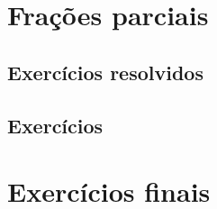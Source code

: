 \section{Frações parciais}
\construirSec


\subsection*{Exercícios resolvidos}

\construirExeresol


\subsection*{Exercícios}

\construirExer

\section{Exercícios finais}

\construirExer


